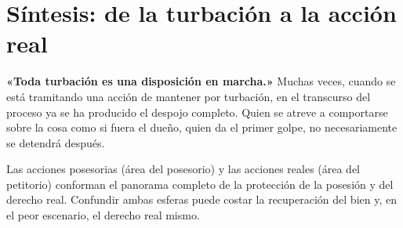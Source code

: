 \documentclass[12pt,oneside]{book}
\begin{document}
\section{Síntesis: de la turbación a la acción real}

\begin{important}
\textbf{«Toda turbación es una disposición en marcha.»} Muchas veces, cuando se está tramitando una acción de mantener por turbación, en el transcurso del proceso ya se ha producido el despojo completo. Quien se atreve a comportarse sobre la cosa como si fuera el dueño, quien da el primer golpe, no necesariamente se detendrá después.
\end{important}

Las acciones posesorias (área del posesorio) y las acciones reales (área del petitorio) conforman el panorama completo de la protección de la posesión y del derecho real. Confundir ambas esferas puede costar la recuperación del bien y, en el peor escenario, el derecho real mismo.
\end{document}
